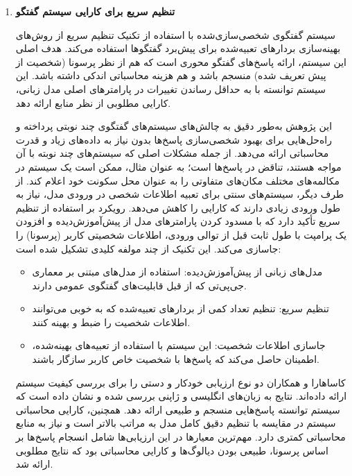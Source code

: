 \begin{enumerate}
\item
\textbf{تنظیم سریع برای کارایی سیستم گفتگو}

سیستم گفتگوی شخصی‌سازی‌شده با استفاده از تکنیک تنظیم سریع%
\cite{kasahara2022building}
 از روش‌های بهینه‌سازی 
بردارهای تعبیه‌شده%
 برای پیش‌برد گفتگوها استفاده می‌کند. هدف اصلی این سیستم، ارائه پاسخ‌های گفتگو محوری است که هم از نظر 
پرسونا%
(شخصیت از پیش تعریف شده) منسجم باشد و هم هزینه محاسباتی اندکی داشته باشد. این سیستم توانسته با به‌ حداقل رساندن تغییرات در پارامترهای اصلی مدل زبانی، کارایی مطلوبی از نظر منابع ارائه دهد.

این پژوهش به‌طور دقیق به چالش‌های 
سیستم‌های گفتگوی چند نوبتی%
پرداخته و راه‌حل‌هایی برای بهبود شخصی‌سازی پاسخ‌ها بدون نیاز به داده‌های زیاد و قدرت محاسباتی ارائه می‌دهد. از جمله مشکلات اصلی که سیستم‌های چند نوبته با آن مواجه هستند، تناقض در پاسخ‌ها است؛ به عنوان مثال، ممکن است یک سیستم در مکالمه‌های مختلف مکان‌های متفاوتی را به عنوان محل سکونت خود اعلام کند. از طرف دیگر، سیستم‌های سنتی برای تعبیه اطلاعات شخصی در ورودی مدل، نیاز به طول ورودی زیادی دارند که کارایی را کاهش می‌دهد.
\newline
رویکرد %
\cite{kasahara2022building}
 بر استفاده از تنظیم سریع تأکید دارد که با مسدود کردن پارامترهای مدل از پیش‌آموزش‌دیده و افزودن یک پرامپت با طول ثابت قبل از توالی ورودی، اطلاعات شخصیتی کاربر (پرسونا) را جاسازی می‌کند. 
\newline
این تکنیک از چند مولفه کلیدی تشکیل شده است:
\begin{itemize}
\item
مدل‌های زبانی از پیش‌آموزش‌دیده: استفاده از مدل‌های مبتنی بر معماری جی‌پی‌تی که از قبل قابلیت‌های گفتگوی عمومی دارند.
\item
تنظیم سریع: تنظیم تعداد کمی از بردارهای تعبیه‌شده که به خوبی می‌توانند اطلاعات شخصیت را ضبط و بهینه کنند.
\item
جاسازی اطلاعات شخصیت: این سیستم با استفاده از تعبیه‌های بهینه‌شده، اطمینان حاصل می‌کند که پاسخ‌ها با شخصیت خاص کاربر سازگار باشند.
\end{itemize}

کاساهارا و همکاران%
\cite{kasahara2022building}
 دو نوع ارزیابی خودکار و دستی را برای بررسی کیفیت سیستم ارائه داده‌اند. نتایج به زبان‌های انگلیسی و ژاپنی بررسی شده و نشان داده است که سیستم توانسته پاسخ‌هایی منسجم و طبیعی ارائه دهد. همچنین، کارایی محاسباتی سیستم در مقایسه با تنظیم دقیق کامل مدل به مراتب بالاتر است و نیاز به منابع محاسباتی کمتری دارد. مهم‌ترین معیارها در این ارزیابی‌ها شامل انسجام پاسخ‌ها بر اساس پرسونا، طبیعی بودن دیالوگ‌ها و کارایی محاسباتی بود که نتایج مطلوبی ارائه شد.


\end{enumerate}
